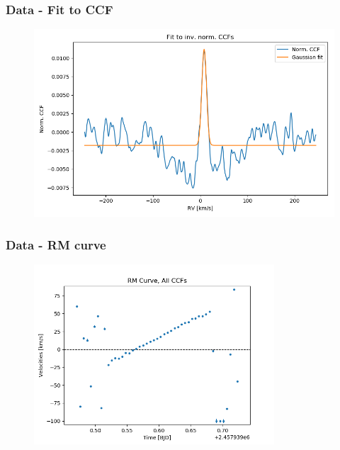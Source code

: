 \documentclass[show notes]{beamer}
\begin{document}
\begin{frame}
\frametitle{Data - Fit to CCF}
\begin{figure}
	\centering
	\includegraphics[width=\textwidth]{../figures/fitted_ccf.png}
	\label{fig:fitted_ccf}
\end{figure}
\end{frame}

\begin{frame}
\frametitle{Data - RM curve}
	\begin{figure}
		\centering
		\includegraphics[width=0.8\textwidth]{../figures/RM_all_CCFs.png}
		\label{fig:RM_all_CCFs}
	\end{figure}
\end{frame}
\end{document}
